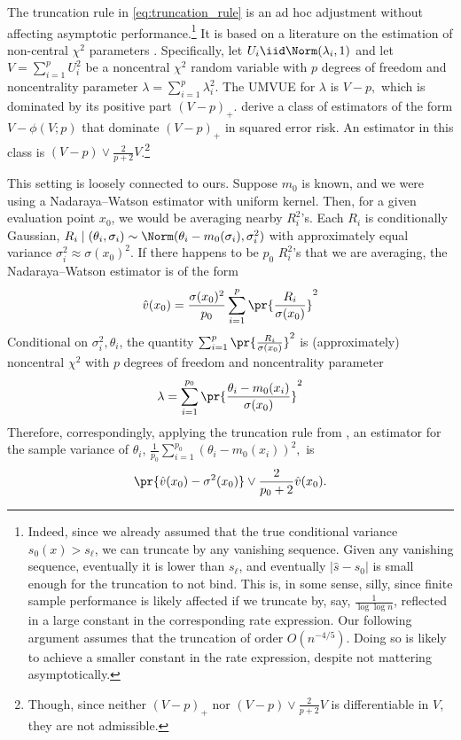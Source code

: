\documentclass[12pt, reqno]{amsart}
\newcommand{\hats}{\hat s}
\numberwithin{equation}{section}
\begin{document}
\begin{refsection}
\begin{appendices}
\begin{rmksq}
\label{rmk:truncate}
The truncation rule in  \eqref{eq:truncation_rule} is an ad hoc adjustment without affecting asymptotic
performance.\footnote{Indeed, since we already assumed that the true conditional variance
$s_0(x) > s_{\ell}$, we can truncate by any vanishing sequence. Given any
vanishing sequence, eventually it is lower than $s_\ell$, and eventually $|\hats
- s_0|$ is small enough for the truncation to not bind. This is, in some sense,
  silly, since finite sample performance is likely affected if we truncate by, say,
  $\frac{1}{\log \log n}$, reflected in a large constant in the corresponding rate
  expression. Our following argument assumes that the truncation of order $O(n^{-4/5})$.
  Doing so is likely to achieve a smaller constant in the rate expression, despite not
  mattering asymptotically. } It is based on a literature on the estimation of non-central
  $\chi^2$ parameters \citep{kubokawa1993estimation}. Specifically, let $U_i \iid \Norm
  (\lambda_i, 1)$ and let $V = \sum_{i=1}^p U_i^2$ be a noncentral $\chi^2$ random
  variable with $p$ degrees of freedom and noncentrality parameter $\lambda = \sum_{i=1}^p
  \lambda_i^2$. The UMVUE for $\lambda$ is $V - p,$ which is dominated by its positive
  part $(V-p)_+$. \citet{kubokawa1993estimation} derive a class of estimators of the form
  $V - \phi(V; p)$ that dominate $(V-p)_+$ in squared error risk. An estimator in this
  class is $(V - p) \vee \frac{2}{p+2} V$.\footnote{Though, since neither $(V-p)_+$ nor
  $(V-p) \vee \frac{2}{p+2} V$ is differentiable in $V$, they are not
  admissible.}

  This setting is loosely connected to ours. Suppose $m_0$ is known, and we were using
  a Nadaraya--Watson estimator with uniform kernel. Then, for a given evaluation point
  $x_0$, we would be averaging nearby $R_i^2$'s. Each $R_i$ is conditionally Gaussian,
  $R_i \mid (\theta_i, \sigma_i) \sim \Norm(\theta_i - m_0
  (\sigma_i), \sigma_i^2)$ with approximately equal variance $\sigma_i^2 \approx
  \sigma(x_0)^2$. If there happens to be $p_0$ $R_i^2$'s that we are averaging, the
  Nadaraya--Watson estimator is of the form \[
\hat v(x_0) = \frac{\sigma(x_0)^2}{p_0} \sum_{i=1}^p \pr{\frac{R_i}{\sigma(x_0)}}^2
  \]
  Conditional on $\sigma_i^2, \theta_i$, the quantity $\sum_{i=1}^p \pr{\frac{R_i}{\sigma(x_0)}}^2$
  is (approximately) noncentral $\chi^2$ with $p$ degrees of freedom and noncentrality
  parameter \[
\lambda = \sum_{i=1}^{p_0} \pr{\frac{\theta_i - m_0(x_i)}{\sigma(x_0)}}^2
  \]
  Therefore, correspondingly, applying the truncation rule from
  \citet{kubokawa1993estimation}, an estimator for the sample variance of $\theta_i$, $
\frac{1}{p_0} \sum_{i=1}^{p_0} (\theta_i - m_0(x_i))^2,
  $ is \[
\pr{\hat v(x_0) - \sigma^2(x_0)} \vee \frac{2}{p_0+2} \hat v(x_0).
  \]


\end{rmksq}
\end{appendices}
\end{refsection}
\end{document}
